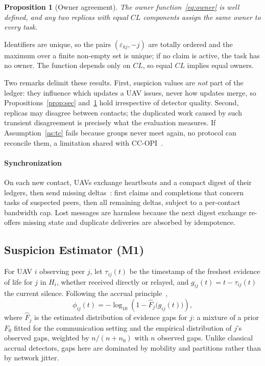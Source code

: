 \documentclass[journal]{IEEEtran}
\newtheorem{proposition}{Proposition}
\begin{document}
\begin{proposition}[Owner agreement]\label{prop:owner}
The owner function~\eqref{eq:owner} is well defined, and any two replicas with equal $\mathit{CL}$ components assign the same owner to every task.
\end{proposition}
\begin{IEEEproof}
Identifiers are unique, so the pairs $(\varepsilon_{kj},-j)$ are totally ordered and the maximum over a finite non-empty set is unique; if no claim is active, the task has no owner. The function depends only on $\mathit{CL}$, so equal $\mathit{CL}$ implies equal owners.
\end{IEEEproof}

Two remarks delimit these results. First, suspicion values are \emph{not} part of the ledger: they influence which updates a UAV issues, never how updates merge, so Propositions~\ref{prop:sec} and~\ref{prop:owner} hold irrespective of detector quality. Second, replicas may disagree between contacts; the duplicated work caused by such transient disagreement is precisely what the evaluation measures. If Assumption~\ref{as:tc} fails because groups never meet again, no protocol can reconcile them, a limitation shared with CC-OPI~\cite{R66_liu2026}.

\paragraph*{Synchronization} On each new contact, UAVs exchange heartbeats and a compact digest of their ledgers, then send missing deltas~\cite{R73_almeida2018}: first claims and completions that concern tasks of suspected peers, then all remaining deltas, subject to a per-contact bandwidth cap. Lost messages are harmless because the next digest exchange re-offers missing state and duplicate deliveries are absorbed by idempotence.

\subsection{Suspicion Estimator (M1)}\label{sec:suspicion}
For UAV $i$ observing peer $j$, let $\tau_{ij}(t)$ be the timestamp of the freshest evidence of life for $j$ in $H_i$, whether received directly or relayed, and $g_{ij}(t)=t-\tau_{ij}(t)$ the current silence. Following the accrual principle~\cite{R07_hayashibara2004},
\begin{equation}
\phi_{ij}(t)=-\log_{10}\!\left(1-\hat F_j\big(g_{ij}(t)\big)\right),
\end{equation}
where $\hat F_j$ is the estimated distribution of evidence gaps for $j$: a mixture of a prior $F_0$ fitted for the communication setting and the empirical distribution of $j$'s observed gaps, weighted by $n/(n+n_0)$ with $n$ observed gaps. Unlike classical accrual detectors, gaps here are dominated by mobility and partitions rather than by network jitter.
\end{document}
